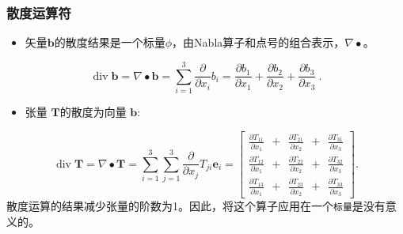 \documentclass[MathematicsNumericsDerivationsAndOpenFOAM.tex]{subfiles}
\begin{document}
\subsubsection{散度运算符}
%
%
\begin{itemize}
    \item 矢量$\textbf{b}$的散度结果是一个标量$\phi$，由Nabla算子和点号的组合表示，$\nabla \bullet$。
\end{itemize}
%
%
\begin{equation}
 \operatorname{div} \textbf{b} = \nabla \bullet \textbf{b} = \sum_{i=1}^{3} \frac{\partial}{\partial x_i} b_i
=
  \frac{\partial b_1}{\partial x_1} + \frac{\partial b_2}{\partial x_2} + \frac{\partial b_3}{\partial x_3} ~.
  \label{EQUATION::divVector}
\end{equation}
%
%
\begin{itemize}
    \item 张量 $\textbf{T}$的散度为向量 $\textbf{b}$:
\end{itemize}
%
%
\begin{equation}
  \operatorname{div} \textbf{T} = \nabla \bullet \textbf{T}
=
  \sum_{i=1}^{3}\sum_{j=1}^{3} \frac{\partial}{\partial x_j} T_{ji} \textbf{e}_i
=
  \left[
  \begin{matrix}
   \frac{\partial T_{11}}{\partial x_1} ~ ~ + ~ ~ \frac{\partial T_{21}}{\partial x_2} ~ ~ + ~ ~ \frac{\partial T_{31}}{\partial x_3} \\
   \frac{\partial T_{12}}{\partial x_1} ~ ~ + ~ ~ \frac{\partial T_{22}}{\partial x_2} ~ ~ + ~ ~ \frac{\partial T_{32}}{\partial x_3} \\
   \frac{\partial T_{13}}{\partial x_1} ~ ~ + ~ ~ \frac{\partial T_{23}}{\partial x_2} ~ ~ + ~ ~ \frac{\partial T_{33}}{\partial x_3}
  \end{matrix}
  \right] .
  \label{EQUATION::divTensor}
\end{equation}
%
%
    散度运算的结果$\textit{减少}$张量的阶数为1。因此，将这个算子应用在一个\texttt{标量}是没有意义的。
%
%
%
%
\end{document}
